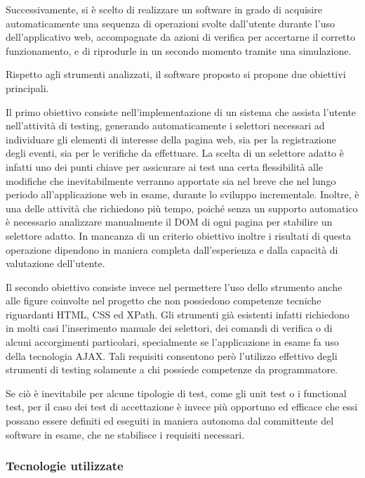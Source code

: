 \documentclass[a4paper,12pt]{article}
\begin{document}
Successivamente, si è scelto di realizzare un software in grado di acquisire automaticamente una sequenza di operazioni svolte dall'utente durante l'uso dell'applicativo web, accompagnate da azioni di verifica per accertarne il corretto funzionamento, e di riprodurle in un secondo momento tramite una simulazione. 

Rispetto agli strumenti analizzati, il software proposto si propone due obiettivi principali. 

Il primo obiettivo consiste nell'implementazione di un sistema che assista l'utente nell'attività di testing, generando automaticamente i selettori necessari ad individuare gli elementi di interesse della pagina web, sia per la registrazione degli eventi, sia per le verifiche da effettuare. La scelta di un selettore adatto è infatti uno dei punti chiave per assicurare ai test una certa flessibilità alle modifiche che inevitabilmente verranno apportate sia nel breve che nel lungo periodo all'applicazione web in esame, durante lo sviluppo incrementale. Inoltre, è una delle attività che richiedono più tempo, poiché senza un supporto automatico è necessario analizzare manualmente il DOM di ogni pagina per stabilire un selettore adatto. In mancanza di un criterio obiettivo inoltre i risultati di questa operazione dipendono in maniera completa dall'esperienza e dalla capacità di valutazione dell'utente.

Il secondo obiettivo consiste invece nel permettere l'uso dello strumento anche alle figure coinvolte nel progetto che non possiedono competenze tecniche riguardanti HTML, CSS ed XPath. Gli strumenti già esistenti infatti richiedono in molti casi l'inserimento manuale dei selettori, dei comandi di verifica o di alcuni accorgimenti particolari, specialmente se l'applicazione in esame fa uso della tecnologia AJAX. Tali requisiti consentono però l'utilizzo effettivo degli strumenti di testing solamente a chi possiede competenze da programmatore. 

Se ciò è inevitabile per alcune tipologie di test, come gli unit test o i functional test, per il caso dei test di accettazione è invece più opportuno ed efficace che essi possano essere definiti ed eseguiti in maniera autonoma dal committente del software in esame, che ne stabilisce i requisiti necessari.

\subsubsection*{Tecnologie utilizzate}
\end{document}

